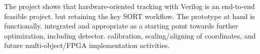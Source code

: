\documentclass[12pt,a4paper]{article}
\begin{document}
\vspace{-0.8em}
The project shows that hardware-oriented tracking with Verilog is an end-to-end feasible project. 
but retaining the key SORT workflow. The prototype at hand is functionally. 
integrated and appropriate as a starting point towards further optimization, including detector. 
calibration, scaling/aligning of coordinates, and future multi-object/FPGA implementation activities.
\end{document}
